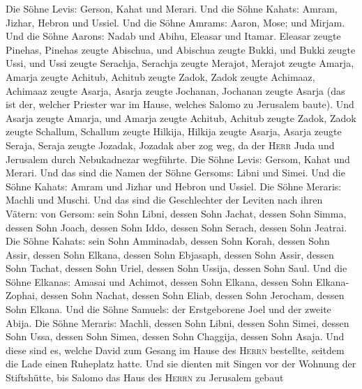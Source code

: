  Die Söhne Levis: Gerson, Kahat und Merari. Und die Söhne
Kahats:  Amram, Jizhar, Hebron und Ussiel. Und die Söhne
Amrams:  Aaron, Mose; und Mirjam. Und die Söhne Aarons:
Nadab und Abihu, Eleasar und Itamar.  Eleasar zeugte
Pinehas, Pinehas zeugte Abischua,  und Abischua zeugte
Bukki, und Bukki zeugte Ussi,  und Ussi zeugte Serachja,
Serachja zeugte Merajot,  Merajot zeugte Amarja, Amarja
zeugte Achitub,  Achitub zeugte Zadok, Zadok zeugte
Achimaaz,  Achimaaz zeugte Asarja, Asarja zeugte Jochanan,
 Jochanan zeugte Asarja (das ist der, welcher Priester
war im Hause, welches Salomo zu Jerusalem baute).  Und
Asarja zeugte Amarja, und Amarja zeugte Achitub, Achitub zeugte Zadok,
 Zadok zeugte Schallum,  Schallum zeugte
Hilkija, Hilkija zeugte Asarja,  Asarja zeugte Seraja,
Seraja zeugte Jozadak,  Jozadak aber zog weg, da der
\textsc{Herr} Juda und Jerusalem durch Nebukadnezar wegführte.
 Die Söhne Levis: Gersom, Kahat und Merari.
 Und das sind die Namen der Söhne Gersoms: Libni und
Simei.  Und die Söhne Kahats: Amram und Jizhar und Hebron
und Ussiel.  Die Söhne Meraris: Machli und Muschi. Und
das sind die Geschlechter der Leviten nach ihren Vätern: von Gersom:
 sein Sohn Libni, dessen Sohn Jachat, dessen Sohn Simma,
 dessen Sohn Joach, dessen Sohn Iddo, dessen Sohn Serach,
dessen Sohn Jeatrai.  Die Söhne Kahats: sein Sohn
Amminadab, dessen Sohn Korah, dessen Sohn Assir,  dessen
Sohn Elkana, dessen Sohn Ebjasaph,  dessen Sohn Assir,
dessen Sohn Tachat, dessen Sohn Uriel, dessen Sohn Ussija, dessen Sohn
Saul.  Und die Söhne Elkanas: Amasai und Achimot,
 dessen Sohn Elkana, dessen Sohn Elkana-Zophai,
 dessen Sohn Nachat, dessen Sohn Eliab, dessen Sohn
Jerocham, dessen Sohn Elkana.  Und die Söhne Samuels: der
Erstgeborene Joel und der zweite Abija.  Die Söhne
Meraris: Machli, dessen Sohn Libni, dessen Sohn Simei, 
dessen Sohn Ussa, dessen Sohn Simea, dessen Sohn Chaggija, dessen Sohn
Asaja.  Und diese sind es, welche David zum Gesang im
Hause des \textsc{Herrn} bestellte, seitdem die Lade einen Ruheplatz
hatte.  Und sie dienten mit Singen vor der Wohnung der
Stiftshütte, bis Salomo das Haus des \textsc{Herrn} zu Jerusalem gebaut
